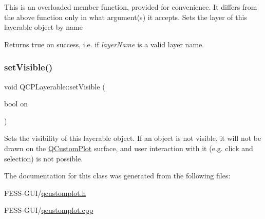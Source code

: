 This is an overloaded member function, provided for convenience. It differs from the above function only in what argument(s) it accepts. Sets the layer of this layerable object by name

Returns true on success, i.\+e. if {\itshape layer\+Name} is a valid layer name. \hypertarget{class_q_c_p_layerable_a3bed99ddc396b48ce3ebfdc0418744f8}{}\label{class_q_c_p_layerable_a3bed99ddc396b48ce3ebfdc0418744f8} 
\subsubsection{\texorpdfstring{set\+Visible()}{setVisible()}}
{\footnotesize\ttfamily void Q\+C\+P\+Layerable\+::set\+Visible (\begin{DoxyParamCaption}\item[{bool}]{on }\end{DoxyParamCaption})}

Sets the visibility of this layerable object. If an object is not visible, it will not be drawn on the \hyperlink{class_q_custom_plot}{Q\+Custom\+Plot} surface, and user interaction with it (e.\+g. click and selection) is not possible. 

The documentation for this class was generated from the following files\+:\begin{DoxyCompactItemize}
\item 
F\+E\+S\+S-\/\+G\+U\+I/\hyperlink{qcustomplot_8h}{qcustomplot.\+h}\item 
F\+E\+S\+S-\/\+G\+U\+I/\hyperlink{qcustomplot_8cpp}{qcustomplot.\+cpp}\end{DoxyCompactItemize}
